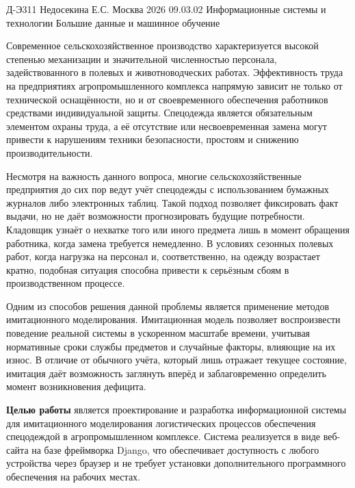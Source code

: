\documentclass[14pt,a4paper]{extreport}
\begin{document}
\begin{singlespacing}
	
	{Д-Э311}
	{Недосекина Е.С.}
	{Москва 2026}
	{09.03.02 Информационные системы и технологии}
	{Большие данные и машинное обучение}
	
	\newpage
	\renewcommand{\contentsname}{\hfill Содержание\hfill}
	\tableofcontents
	\newpage

	\intro
	
	Современное сельскохозяйственное производство характеризуется высокой степенью механизации и значительной численностью персонала, задействованного в полевых и животноводческих работах. Эффективность труда на предприятиях агропромышленного комплекса напрямую зависит не только от технической оснащённости, но и от своевременного обеспечения работников средствами индивидуальной защиты. Спецодежда является обязательным элементом охраны труда, а её отсутствие или несвоевременная замена могут привести к нарушениям техники безопасности, простоям и снижению производительности.
	
	Несмотря на важность данного вопроса, многие сельскохозяйственные предприятия до сих пор ведут учёт спецодежды с использованием бумажных журналов либо электронных таблиц. Такой подход позволяет фиксировать факт выдачи, но не даёт возможности прогнозировать будущие потребности. Кладовщик узнаёт о нехватке того или иного предмета лишь в момент обращения работника, когда замена требуется немедленно. В условиях сезонных полевых работ, когда нагрузка на персонал и, соответственно, на одежду возрастает кратно, подобная ситуация способна привести к серьёзным сбоям в производственном процессе.
	
	Одним из способов решения данной проблемы является применение методов имитационного моделирования. Имитационная модель позволяет воспроизвести поведение реальной системы в ускоренном масштабе времени, учитывая нормативные сроки службы предметов и случайные факторы, влияющие на их износ. В отличие от обычного учёта, который лишь отражает текущее состояние, имитация даёт возможность заглянуть вперёд и заблаговременно определить момент возникновения дефицита.
	
	\textbf{Целью работы} является проектирование и разработка информационной системы для имитационного моделирования логистических процессов обеспечения спецодеждой в агропромышленном комплексе. Система реализуется в виде веб-сайта на базе фреймворка Django, что обеспечивает доступность с любого устройства через браузер и не требует установки дополнительного программного обеспечения на рабочих местах.
	

\end{singlespacing}
\end{document}
